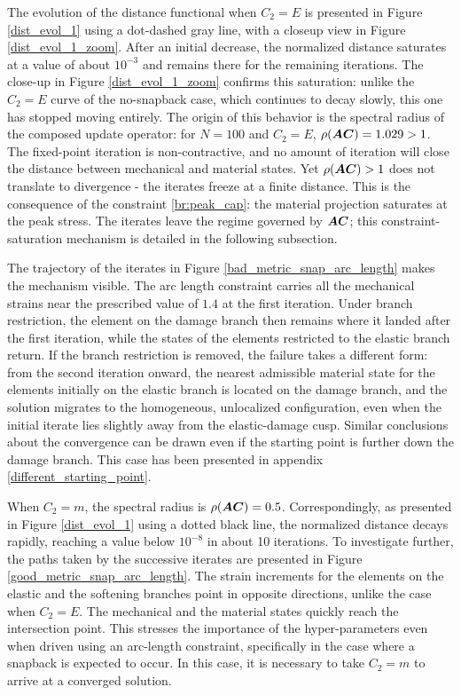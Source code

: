 \documentclass[10pt,review]{cas-sc}
\begin{document}
The evolution of the distance functional when $C_2=E$ is presented in Figure \ref{dist_evol_1} using a dot-dashed gray line, with a closeup view in Figure \ref{dist_evol_1_zoom}. After an initial decrease, the normalized distance saturates at a value of about $10^{-3}$ and remains there for the remaining iterations. The close-up in Figure \ref{dist_evol_1_zoom} confirms this saturation: unlike the $C_2=E$ curve of the no-snapback case, which continues to decay slowly, this one has stopped moving entirely. The origin of this behavior is the spectral radius of the composed update operator: for $N=100$ and $C_2=E$, $\rho(\mbox{\boldmath $A$}\mbox{\boldmath $C$}) = 1.029 > 1$. The fixed-point iteration is non-contractive, and no amount of iteration will close the distance between mechanical and material states. Yet $\rho(\mbox{\boldmath $A$}\mbox{\boldmath $C$}) > 1$ does not translate to divergence - the iterates freeze at a finite distance. This is the consequence of the constraint \ref{br:peak_cap}: the material projection saturates at the peak stress. The iterates leave the regime governed by $\mbox{\boldmath $A$}\mbox{\boldmath $C$}$; this constraint-saturation mechanism is detailed in the following subsection.

The trajectory of the iterates in Figure \ref{bad_metric_snap_arc_length} makes the mechanism visible. The arc length constraint carries all the mechanical strains near the prescribed value of $1.4$ at the first iteration. Under branch restriction, the element on the damage branch then remains where it landed after the first iteration, while the states of the elements restricted to the elastic branch return. If the branch restriction is removed, the failure takes a different form: from the second iteration onward, the nearest admissible material state for the elements initially on the elastic branch is located on the damage branch, and the solution migrates to the homogeneous, unlocalized configuration, even when the initial iterate lies slightly away from the elastic-damage cusp. Similar conclusions about the convergence can be drawn even if the starting point is further down the damage branch. This case has been presented in appendix \ref{different_starting_point}.


When $C_2=m$, the spectral radius is $\rho(\mbox{\boldmath $A$}\mbox{\boldmath $C$}) = 0.5$. Correspondingly, as presented in Figure \ref{dist_evol_1} using a dotted black line, the normalized distance decays rapidly, reaching a value below $10^{-8}$ in about 10 iterations. To investigate further, the paths taken by the successive iterates are presented in Figure \ref{good_metric_snap_arc_length}. The strain increments for the elements on the elastic and the softening branches point in opposite directions, unlike the case when $C_2=E$. The mechanical and the material states quickly reach the intersection point. This stresses the importance of the hyper-parameters even when driven using an arc-length constraint, specifically in the case where a snapback is expected to occur. In this case, it is necessary to take $C_2=m$ to arrive at a converged solution.
\end{document}
